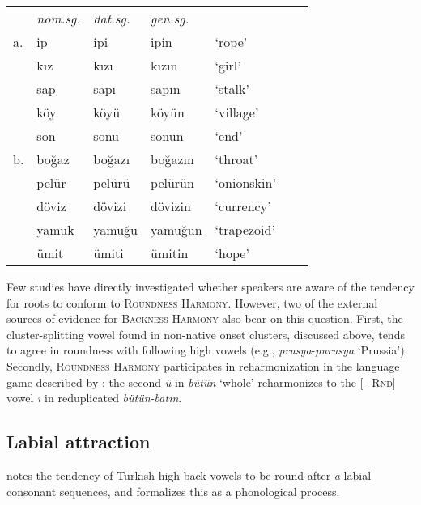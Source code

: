\begin{example}
\begin{tabular}{lllllll}
   & \emph{nom.sg.} & \emph{dat.sg.} & \emph{gen.sg.}  \\
a. & {ip}           & {ipi}          & {ipin}         & `rope' & \citep[][216]{Clements1982} \\
   & {kız}          & {kızı}         & {kızın}        & `girl'    \\
   & {sap}          & {sapı}         & {sapın}        & `stalk'  \\
   & {köy}          & {köyü}         & {köyün}        & `village' \\
   & {son}          & {sonu}         & {sonun}        & `end'     \\
b. & {boğaz}        & {boğazı}       & {boğazın}      & `throat'  & \citep{TELL} \\
   & {pelür}        & {pelürü}       & {pelürün}      & `onionskin' \\
   & {döviz}        & {dövizi}       & {dövizin}      & `currency'  \\
   & {yamuk}        & {yamuğu}       & {yamuğun}      & `trapezoid' \\
   & {ümit}         & {ümiti}        & {ümitin}       & `hope'      \\
\end{tabular}
\end{example}

Few studies have directly investigated whether speakers are aware of the tendency for roots to conform to \textsc{Roundness Harmony}. 
However, two of the external sources of evidence for \textsc{Backness Harmony} also bear on this question.
First, the cluster-splitting vowel found in non-native onset clusters, discussed above, tends to agree in roundness with following high vowels (e.g., \emph{prusya}-\emph{purusya} `Prussia'). 
Secondly, \textsc{Roundness Harmony} participates in reharmonization in the language game described by \citeauthor{Harrison2001}: the second \emph{ü} in \emph{bütün} `whole' reharmonizes to the [$-$\textsc{Rnd}] vowel \emph{ı} in reduplicated \emph{bütün-batın}.

\subsection{Labial attraction}

\citet[35]{Lees1966b} notes the tendency of Turkish high back vowels to be round after \emph{a}-labial consonant sequences, and formalizes this as a phonological process.

